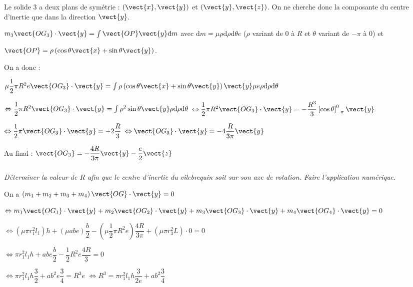 \begin{multicols}{2}
\begin{corrige}
Le solide 3 a deux plans de symétrie : $\left(\vect{x},\vect{y}\right)$ et $\left(\vect{y},\vect{z}\right)$. On ne cherche donc la composante du centre d'inertie que dans la direction $\vect{y}$.

$m_3 \vect{OG_3}\cdot \vect{y} = \int \vect{OP}\vect{y} \text{d}m$ avec $\text{d}m=\mu \rho \text{d}\rho\text{d}\theta e $ ($\rho$ variant de 0 à $R$ et $\theta$ variant de $-\pi$ à 0) et 

$\vect{OP}=\rho\left( \cos\theta \vect{x}+ \sin\theta \vect{y}\right)$. 

On a donc : 

$ \mu \dfrac{1}{2}\pi R^2 e \vect{OG_3}\cdot \vect{y} = \int \rho\left( \cos\theta \vect{x}+ \sin\theta \vect{y}\right) \vect{y} \mu e\rho \text{d}\rho\text{d}\theta $

$ \Leftrightarrow \dfrac{1}{2}\pi R^2  \vect{OG_3}\cdot \vect{y} = \int \rho^2 \sin\theta  \vect{y} \rho \text{d}\rho\text{d}\theta $
$ \Leftrightarrow \dfrac{1}{2}\pi R^2  \vect{OG_3}\cdot \vect{y} = -\dfrac{R^3}{3}  \left[\cos\theta \right]_{-\pi}^0  \vect{y}$

$ \Leftrightarrow \dfrac{1}{2}\pi  \vect{OG_3}\cdot \vect{y} = -2\dfrac{R}{3}  $
$ \Leftrightarrow  \vect{OG_3}\cdot \vect{y} = -4\dfrac{R}{3\pi}  \vect{y} $

Au final : 
$\vect{OG_3} = -\dfrac{4R}{3\pi}  \vect{y}-\dfrac{e}{2}\vect{z}$
\end{corrige}\else\fi

\subparagraph{}\textit{Déterminer la valeur de $R$ afin que le centre d’inertie du vilebrequin soit sur son axe de rotation. Faire l’application numérique.}

\ifprof \begin{corrige}
On a $\left( m_1+m_2+m_3+m_4\right) \vect{OG}\cdot \vect{y}=0 $

$\Leftrightarrow m_1 \vect{OG_1}\cdot \vect{y}+m_2 \vect{OG_2}\cdot \vect{y}+m_3 \vect{OG_3}\cdot \vect{y}+m_4 \vect{OG_4}\cdot \vect{y} = 0$

$\Leftrightarrow \left(\mu \pi r_1^2 l_1\right) h+\left(\mu a b e\right) \dfrac{b}{2}-\left(\mu \dfrac{1}{2}\pi R^2 e\right) \dfrac{4R}{3\pi} +\left(\mu \pi r_3^2L\right) \cdot 0 = 0$


$\Leftrightarrow  \pi r_1^2 l_1 h+a b e \dfrac{b}{2}- \dfrac{1}{2} R^2 e \dfrac{4R}{3}  = 0$

$\Leftrightarrow  \pi r_1^2 l_1 h\dfrac{3}{2}+a b^2 e \dfrac{3}{4}=  R^3 e  $
$\Leftrightarrow   R^3 = \pi r_1^2 l_1 h\dfrac{3}{2e}+a b^2 \dfrac{3}{4}    $
\end{corrige}\else\fi


\end{multicols}
